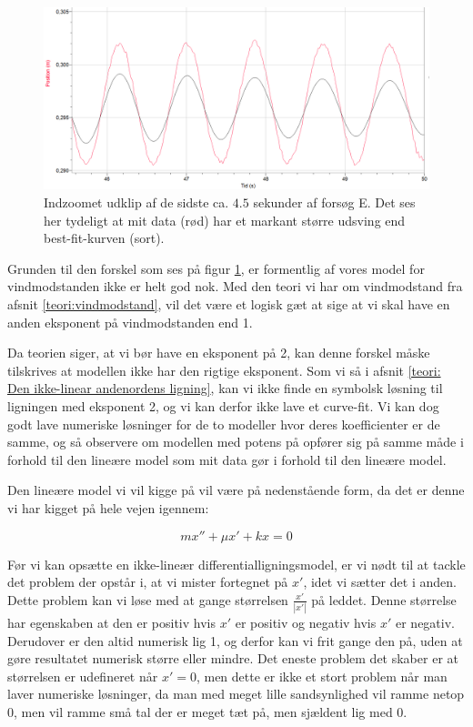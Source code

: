 \begin{figure}[h]
\center
\includegraphics[scale=0.5]{Figurer/Kurvefejl}
\caption{Indzoomet udklip af de sidste ca. $4.5$ sekunder af forsøg E. Det ses her tydeligt  at mit data (rød) har et markant større udsving end best-fit-kurven (sort).}
\label{fig: Fejlkurve exp2}
\end{figure}

Grunden til den forskel som ses på figur \ref{fig: Fejlkurve exp2}, er formentlig af vores model for vindmodstanden ikke er helt god nok. 
Med den teori vi har om vindmodstand fra afsnit \ref{teori:vindmodstand}, vil det være et logisk gæt at sige at vi skal have en anden eksponent på vindmodstanden end 1. 

Da teorien siger, at vi bør have en eksponent på 2, kan denne forskel måske tilskrives at modellen ikke har den rigtige eksponent.
Som vi så i afsnit \ref{teori: Den ikke-linear andenordens ligning}, kan vi ikke finde en symbolsk løsning til ligningen med eksponent 2, og vi kan derfor ikke lave et curve-fit. 
Vi kan dog godt lave numeriske løsninger for de to modeller hvor deres koefficienter er de samme, og så observere om modellen med potens på opfører sig på samme måde i forhold til den lineære model som mit data gør i forhold til den lineære model.

Den lineære model vi vil kigge på vil være på nedenstående form, da det er denne vi har kigget på hele vejen igennem:

\begin{equation}
mx'' + \mu x' + kx = 0
\label{eq: standard linear diff}
\end{equation}
 

Før vi kan opsætte en ikke-lineær differentialligningsmodel, er vi nødt til at tackle det problem der opstår i, at vi mister fortegnet på $x'$, idet vi sætter det i anden.
Dette problem kan vi løse med at gange størrelsen $\frac{x'}{|x'|}$ på leddet. 
Denne størrelse har egenskaben at den er positiv hvis $x'$ er positiv og negativ hvis $x'$ er negativ. 
Derudover er den altid numerisk lig 1, og derfor kan vi frit gange den på, uden at gøre resultatet numerisk større eller mindre. 
Det eneste problem det skaber er at størrelsen er udefineret når $x'=0$, men dette er ikke et stort problem når man laver numeriske løsninger, da man med meget lille sandsynlighed vil ramme netop 0, men vil ramme små tal der er meget tæt på, men sjældent lig med 0. 

